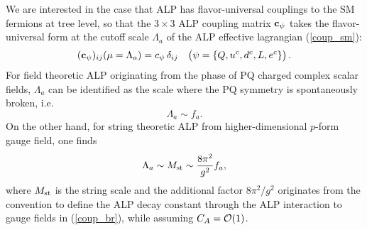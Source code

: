 \documentclass[preprint,prd,aps,tighten,nofootinbib,amssymb]{revtex4}
\newcommand{\dis}[1]{\begin{equation}\begin{split}#1\end{split}\end{equation}}
\newcommand{\C}{\bold c}
\begin{document}
We are interested in the case that ALP has flavor-universal couplings to the SM fermions at tree level, so
that the $3\times 3$ ALP coupling matrix $\C_\psi$ takes the flavor-universal form at the cutoff scale $\Lambda_a$ of the ALP effective lagrangian (\ref{coup_sm}): 
\dis{
\label{MF}
(\C_\psi)_{ij} (\mu =\Lambda_a) = c_\psi\, \delta_{ij} \quad \big( \psi=\{Q, u^c, d^c, L, e^c\}\big)\, .
} 
For field theoretic ALP originating from the phase of PQ charged complex scalar fields, $\Lambda_a$ can be identified as the scale where the PQ symmetry is spontaneously broken, i.e. $$\Lambda_a\sim f_a.$$
On the other hand, for string theoretic ALP from higher-dimensional $p$-form gauge field, one finds \cite{Choi:1985je,Svrcek:2006yi, Arvanitaki:2009fg} $$\Lambda_a\sim M_{\rm st} \sim \frac{8\pi^2}{g^2} f_a,$$ where $M_{\rm st}$ is the string scale and the additional  factor $8\pi^2/g^2$ originates from the convention to define the ALP decay constant through the ALP interaction to gauge fields in (\ref{coup_br}), while assuming  $C_A={\cal O}(1)$.   
\end{document}
